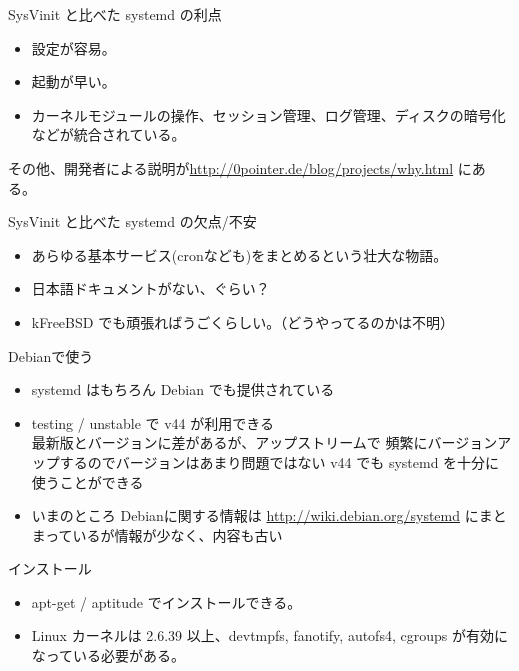 \begin{frame}{SysVinit と比べた systemd の利点}

\begin{itemize}
\item 設定が容易。
\item 起動が早い。
\item カーネルモジュールの操作、セッション管理、ログ管理、ディスクの暗号化などが統合されている。
\end{itemize}

その他、開発者による説明が\url{http://0pointer.de/blog/projects/why.html}
にある。

\end{frame}

\begin{frame}{SysVinit と比べた systemd の欠点/不安}

\begin{itemize}
\item あらゆる基本サービス(cronなども)をまとめるという壮大な物語。
\item 日本語ドキュメントがない、ぐらい？
\item kFreeBSD でも頑張ればうごくらしい。（どうやってるのかは不明）
\end{itemize}

\end{frame}

\begin{frame}{Debianで使う}

\begin{itemize}
\item systemd はもちろん Debian でも提供されている
\item testing / unstable で v44 が利用できる\\
最新版とバージョンに差があるが、アップストリームで
頻繁にバージョンアップするのでバージョンはあまり問題ではない
v44 でも systemd を十分に使うことができる

\item いまのところ Debianに関する情報は \url{http://wiki.debian.org/systemd}
にまとまっているが情報が少なく、内容も古い
\end{itemize}

\end{frame}

\begin{frame}[containsverbatim]{インストール}

\begin{itemize}
\item apt-get / aptitude でインストールできる。
\item Linux カーネルは 2.6.39 以上、devtmpfs, fanotify, autofs4, cgroups が有効になっている必要がある。
\end{itemize}

\end{frame}


